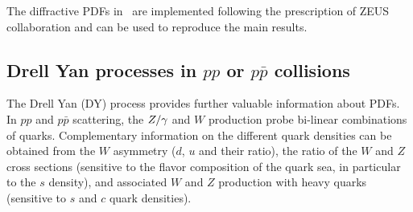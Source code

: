 The diffractive PDFs in \fitter\ are implemented following the prescription of ZEUS
collaboration \cite{zeus:diff2009} and can be used to reproduce the main results.
%




\subsection{Drell Yan processes  in $pp$ or $p\bar p$ collisions}
\label{dysection}

The Drell Yan (DY) process
provides further valuable information about PDFs.
In $pp$ and $p\bar p$ scattering, the $Z/\gamma\*$ and $W$ production 
probe bi-linear combinations of quarks. 
Complementary information on the different quark densities
can be obtained from the $W$ asymmetry ($d$, $u$ and their ratio),
the ratio of the $W$ and $Z$ cross sections (sensitive to the flavor 
composition of the quark sea, in particular to the $s$ density), 
and associated $W$ and $Z$ production with
heavy quarks (sensitive to $s$ and $c$ quark densities).
%

